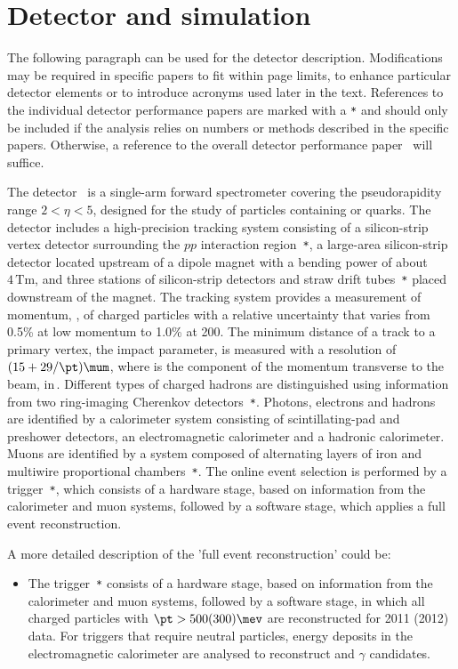 \section{Detector and simulation}
\label{sec:Detector}
The following paragraph can be used for the detector
description. Modifications may be required in specific papers to fit
within page limits, to enhance particular detector elements or to
introduce acronyms used later in the text.
References to the individual detector performance papers are marked with 
a \verb!*!
and should only be included if the analysis relies on numbers or methods 
described in the specific papers. Otherwise, a reference to the overall 
detector performance paper~\cite{LHCb-DP-2014-002} will suffice.

The \lhcb detector~\cite{Alves:2008zz,LHCb-DP-2014-002} is a single-arm forward
spectrometer covering the \mbox{pseudorapidity} range $2<\eta <5$,
designed for the study of particles containing \bquark or \cquark
quarks. The detector includes a high-precision tracking system
consisting of a silicon-strip vertex detector surrounding the $pp$
interaction region~\cite{LHCb-DP-2014-001}\verb!*!, a large-area silicon-strip detector located
upstream of a dipole magnet with a bending power of about
$4{\mathrm{\,Tm}}$, and three stations of silicon-strip detectors and straw
drift tubes~\cite{LHCb-DP-2013-003}\verb!*! placed downstream of the magnet.
The tracking system provides a measurement of momentum, \ptot, of charged particles with
a relative uncertainty that varies from 0.5\% at low momentum to 1.0\% at 200\gevc.
The minimum distance of a track to a primary vertex, the impact parameter, is measured with a resolution of $(15+29/\pt)\mum$,
where \pt is the component of the momentum transverse to the beam, in\,\gevc.
Different types of charged hadrons are distinguished using information
from two ring-imaging Cherenkov detectors~\cite{LHCb-DP-2012-003}\verb!*!. 
Photons, electrons and hadrons are identified by a calorimeter system consisting of
scintillating-pad and preshower detectors, an electromagnetic
calorimeter and a hadronic calorimeter. Muons are identified by a
system composed of alternating layers of iron and multiwire
proportional chambers~\cite{LHCb-DP-2012-002}\verb!*!.
The online event selection is performed by a trigger~\cite{LHCb-DP-2012-004}\verb!*!, 
which consists of a hardware stage, based on information from the calorimeter and muon
systems, followed by a software stage, which applies a full event
reconstruction.

A more detailed description of the 'full event reconstruction' could be:
\begin{itemize}
\item The trigger~\cite{LHCb-DP-2012-004}\verb!*! consists of a
hardware stage, based on information from the calorimeter and muon
systems, followed by a software stage, in which all charged particles
with $\pt>500(300)\mev$ are reconstructed for 2011 (2012) data.
For triggers that require neutral particles, 
energy deposits in the electromagnetic calorimeter are 
analysed to reconstruct \piz and $\gamma$ candidates.
\end{itemize}

